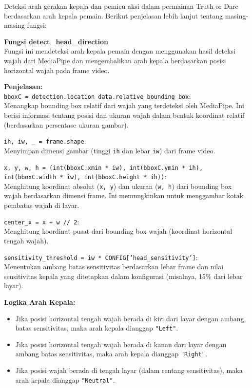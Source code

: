 \documentclass[11pt,a4paper]{article}
\begin{document}
Deteksi arah gerakan kepala dan pemicu aksi dalam permainan Truth or Dare berdasarkan arah kepala pemain. Berikut penjelasan lebih lanjut tentang masing-masing fungsi:

\textbf{Fungsi detect\_head\_direction} \\
Fungsi ini mendeteksi arah kepala pemain dengan menggunakan hasil deteksi wajah dari MediaPipe dan mengembalikan arah kepala berdasarkan posisi horizontal wajah pada frame video.

\textbf{Penjelasan:} \\
\texttt{bboxC = detection.location\_data.relative\_bounding\_box}: \\
Menangkap bounding box relatif dari wajah yang terdeteksi oleh MediaPipe. Ini berisi informasi tentang posisi dan ukuran wajah dalam bentuk koordinat relatif (berdasarkan persentase ukuran gambar).

\texttt{ih, iw, \_ = frame.shape}: \\
Menyimpan dimensi gambar (tinggi \texttt{ih} dan lebar \texttt{iw}) dari frame video.

\texttt{x, y, w, h = (int(bboxC.xmin * iw), int(bboxC.ymin * ih), int(bboxC.width * iw), int(bboxC.height * ih))}: \\
Menghitung koordinat absolut (\texttt{x, y}) dan ukuran (\texttt{w, h}) dari bounding box wajah berdasarkan dimensi frame. Ini memungkinkan untuk menggambar kotak pembatas wajah di layar.

\texttt{center\_x = x + w // 2}: \\
Menghitung koordinat pusat dari bounding box wajah (koordinat horizontal tengah wajah).

\texttt{sensitivity\_threshold = iw * CONFIG['head\_sensitivity']}: \\
Menentukan ambang batas sensitivitas berdasarkan lebar frame dan nilai sensitivitas kepala yang ditetapkan dalam konfigurasi (misalnya, 15\% dari lebar layar).

\textbf{Logika Arah Kepala:} \\
\begin{itemize}
    \item Jika posisi horizontal tengah wajah berada di kiri dari layar dengan ambang batas sensitivitas, maka arah kepala dianggap \texttt{"Left"}.
    \item Jika posisi horizontal tengah wajah berada di kanan dari layar dengan ambang batas sensitivitas, maka arah kepala dianggap \texttt{"Right"}.
    \item Jika posisi wajah berada di tengah layar (dalam rentang sensitivitas), maka arah kepala dianggap \texttt{"Neutral"}.
\end{itemize}
\end{document}
